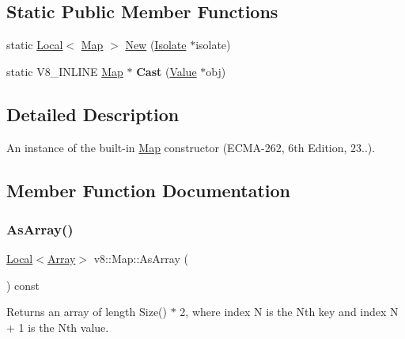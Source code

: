 \subsection*{Static Public Member Functions}
\begin{DoxyCompactItemize}
\item 
static \mbox{\hyperlink{classv8_1_1Local}{Local}}$<$ \mbox{\hyperlink{classv8_1_1Map}{Map}} $>$ \mbox{\hyperlink{classv8_1_1Map_afeefcbe3b73ae398051d4b5bbb3f075d}{New}} (\mbox{\hyperlink{classv8_1_1Isolate}{Isolate}} $\ast$isolate)
\item 
\mbox{\label{classv8_1_1Map_ac53aafed02f275a7d3ce6da8cfd060c3}} 
static V8\+\_\+\+I\+N\+L\+I\+NE \mbox{\hyperlink{classv8_1_1Map}{Map}} $\ast$ {\bfseries Cast} (\mbox{\hyperlink{classv8_1_1Value}{Value}} $\ast$obj)
\end{DoxyCompactItemize}


\subsection{Detailed Description}
An instance of the built-\/in \mbox{\hyperlink{classv8_1_1Map}{Map}} constructor (E\+C\+M\+A-\/262, 6th Edition, 23..). 

\subsection{Member Function Documentation}
\mbox{\label{classv8_1_1Map_a924483cc18fa2f287a43ca2d7eaef763}} 
\subsubsection{\texorpdfstring{As\+Array()}{AsArray()}}
{\footnotesize\ttfamily \mbox{\hyperlink{classv8_1_1Local}{Local}}$<$\mbox{\hyperlink{classv8_1_1Array}{Array}}$>$ v8\+::\+Map\+::\+As\+Array (\begin{DoxyParamCaption}{ }\end{DoxyParamCaption}) const}

Returns an array of length Size() $\ast$ 2, where index N is the Nth key and index N + 1 is the Nth value. \mbox{\label{classv8_1_1Map_afeefcbe3b73ae398051d4b5bbb3f075d}} 
